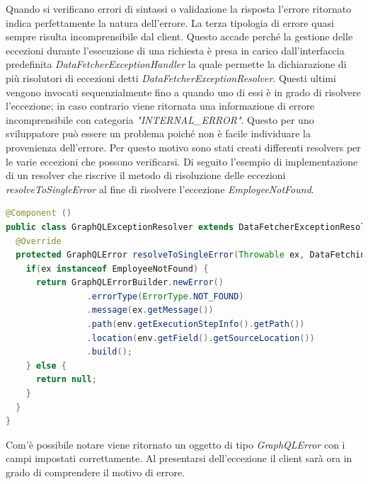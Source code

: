 Quando si verificano errori di sintassi o validazione la risposta l'errore ritornato indica perfettamente la natura dell'errore. La terza tipologia di errore quasi sempre risulta incomprensibile dal client. Questo accade perché la gestione delle eccezioni durante l'esecuzione di una richiesta è presa in carico dall'interfaccia predefinita \textit{DataFetcherExceptionHandler} la quale permette la dichiarazione di più risolutori di eccezioni detti \textit{DataFetcherExceptionResolver}. Questi ultimi vengono invocati sequenzialmente fino a quando uno di essi è in grado di risolvere l'eccezione; in caso contrario viene ritornata una informazione di errore incomprensibile con categoria \textit{"INTERNAL\_ERROR"}. Questo per uno sviluppatore può essere un problema poiché non è facile individuare la provenienza dell'errore. Per questo motivo sono stati creati differenti resolvers per le varie eccezioni che possono verificarsi. Di seguito l'esempio di implementazione di un resolver che riscrive il metodo di risoluzione delle eccezioni \textit{resolveToSingleError} al fine di risolvere l'eccezione \textit{EmployeeNotFound}.
\begin{lstlisting}[language=Java, title={GraphQLExceptionResolver.java}, morecomment={[s][\color{DarkOrchid}]{@}{\ }},  morecomment={[s][\color{OliveGreen}]{"}{"}},]
@Component ()
public class GraphQLExceptionResolver extends DataFetcherExceptionResolverAdapter {
  @Override
  protected GraphQLError resolveToSingleError(Throwable ex, DataFetchingEnvironment env) {
    if(ex instanceof EmployeeNotFound) {
      return GraphQLErrorBuilder.newError()
                .errorType(ErrorType.NOT_FOUND)
                .message(ex.getMessage())
                .path(env.getExecutionStepInfo().getPath())
                .location(env.getField().getSourceLocation())
                .build();
    } else {
      return null;
    }
  }
}
\end{lstlisting}
Com'è possibile notare viene ritornato un oggetto di tipo \textit{GraphQLError} con i campi impostati correttamente. Al presentarsi dell'eccezione il client sarà ora in grado di comprendere il motivo di errore.
